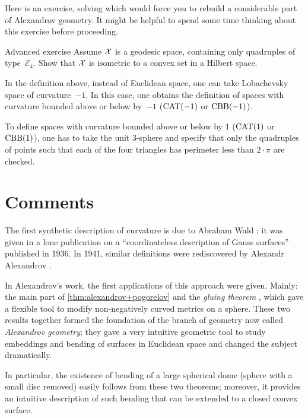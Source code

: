 Here is an exercise, solving which would force you to rebuild a considerable part of Alexandrov geometry.
It might be helpful to spend some time thinking about this exercise before proceeding.

\begin{thm}{Advanced exercise}\label{ex:convex-set}
Assume $\mathcal{X}$ is a geodesic space, 
containing only quadruples of type~$\mathcal{E}_4$.
Show that $\mathcal{X}$ is isometric to a convex set in a Hilbert space.
\end{thm}

In the definition above, instead of Euclidean space, one can take  
Lobachevsky space of curvature~$-1$.
In this case,
one obtains the definition of spaces with curvature bounded above or below by~$-1$ ($\mathrm{CAT}(-1)$ or $\mathrm{CBB}(-1)$).

To define spaces with curvature bounded above or below by $1$ ($\mathrm{CAT}(1)$ or $\mathrm{CBB}(1)$),
one has to take the unit 3-sphere 
and specify that only the quadruples of points such that each of the four triangles has perimeter 
less than $2\cdot\pi$ are checked.

\section{Comments}

The first synthetic description of curvature is due to Abraham Wald \cite{wald}; 
it was given in a lone publication on a ``coordinateless description of Gauss surfaces'' published in 1936.
In 1941, similar definitions were rediscovered by Alexandr Alexandrov \cite{alexandrov:def}.

In Alexandrov's work, the first applications of this approach were given.
Mainly: the main part of \ref{thm:alexandrov+pogorelov} \cite{alexandrov-1941,alexandrov-1941convex}
and the {}\emph{gluing theorem} \cite{alexandrov-1946}, which gave a flexible tool to modify non-negatively curved metrics on a sphere.
These two results together formed the foundation of the branch of geometry now called {}\emph{Alexandrov geometry};
they gave  a very intuitive geometric tool to study embeddings and bending of surfaces in Euclidean space and changed the subject dramatically.

In particular, the existence of bending of a large spherical dome (sphere with a small disc removed) easily follows from these two theorems; moreover, it provides an intuitive description of such bending that can be extended to a closed convex surface.




